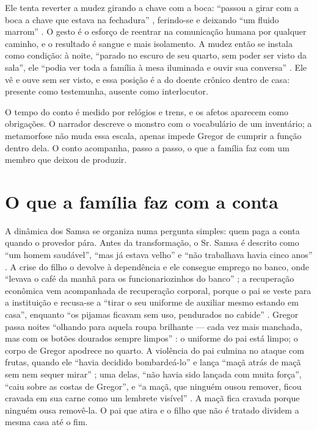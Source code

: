 \documentclass[12pt]{article}
\begin{document}
Ele tenta reverter a mudez girando a chave com a boca: ``passou a girar com a boca a chave que estava na fechadura'' \cite[p. 25]{kafka2022}, ferindo-se e deixando ``um fluido marrom'' \cite[p. 26]{kafka2022}. O gesto é o esforço de reentrar na comunicação humana por qualquer caminho, e o resultado é sangue e mais isolamento. A mudez então se instala como condição: à noite, ``parado no escuro de seu quarto, sem poder ser visto da sala'', ele ``podia ver toda a família à mesa iluminada e ouvir sua conversa'' \cite[p. 70]{kafka2022}. Ele vê e ouve sem ser visto, e essa posição é a do doente crônico dentro de casa: presente como testemunha, ausente como interlocutor.

O tempo do conto é medido por relógios e trens, e os afetos aparecem como obrigações. O narrador descreve o monstro com o vocabulário de um inventário; a metamorfose não muda essa escala, apenas impede Gregor de cumprir a função dentro dela. O conto acompanha, passo a passo, o que a família faz com um membro que deixou de produzir.

\section{O que a família faz com a conta}

A dinâmica dos Samsa se organiza numa pergunta simples: quem paga a conta quando o provedor pára. Antes da transformação, o Sr. Samsa é descrito como ``um homem saudável'', ``mas já estava velho'' e ``não trabalhava havia cinco anos'' \cite[p. 49]{kafka2022}. A crise do filho o devolve à dependência e ele consegue emprego no banco, onde ``levava o café da manhã para os funcionariozinhos do banco'' \cite[p. 73]{kafka2022}; a recuperação econômica vem acompanhada de recuperação corporal, porque o pai se veste para a instituição e recusa-se a ``tirar o seu uniforme de auxiliar mesmo estando em casa'', enquanto ``os pijamas ficavam sem uso, pendurados no cabide'' \cite[p. 70]{kafka2022}. Gregor passa noites ``olhando para aquela roupa brilhante --- cada vez mais manchada, mas com os botões dourados sempre limpos'' \cite[p. 71]{kafka2022}: o uniforme do pai está limpo; o corpo de Gregor apodrece no quarto. A violência do pai culmina no ataque com frutas, quando ele ``havia decidido bombardeá-lo'' e lança ``maçã atrás de maçã sem nem sequer mirar'' \cite[p. 67]{kafka2022}; uma delas, ``não havia sido lançada com muita força'', ``caiu sobre as costas de Gregor'', e ``a maçã, que ninguém ousou remover, ficou cravada em sua carne como um lembrete visível'' \cite[p. 69]{kafka2022}. A maçã fica cravada porque ninguém ousa removê-la. O pai que atira e o filho que não é tratado dividem a mesma casa até o fim.
\end{document}
